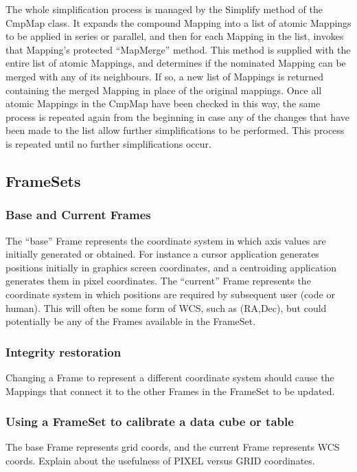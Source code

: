 \documentclass[final,authoryear,5p,times,twocolumn]{elsarticle}
\begin{document}
The whole simplification process is managed by the Simplify method of
the CmpMap class. It expands the compound Mapping into a list of
atomic Mappings to be applied in series or parallel, and then for each
Mapping in the list, invokes that Mapping’s protected “MapMerge”
method. This method is supplied with the entire list of atomic
Mappings, and determines if the nominated Mapping can be merged with
any of its neighbours. If so, a new list of Mappings is returned
containing the merged Mapping in place of the original mappings. Once
all atomic Mappings in the CmpMap have been checked in this way, the
same process is repeated again from the beginning in case any of the
changes that have been made to the list allow further simplifications
to be performed. This process is repeated until no further
simplifications occur.

\subsection{FrameSets}

\subsubsection{Base and Current Frames}

The “base” Frame represents the coordinate system in which axis values
are initially generated or obtained. For instance a cursor application
generates positions initially in graphics screen coordinates, and a
centroiding application generates them in pixel coordinates.  The
“current” Frame represents the coordinate system in which positions
are required by subsequent user (code or human). This will often be
some form of WCS, such as (RA,Dec), but could potentially be any of
the Frames available in the FrameSet.

\subsubsection{Integrity restoration}

Changing a Frame to represent a different coordinate system should
cause the Mappings that connect it to the other Frames in the FrameSet
to be updated.

\subsubsection{Using a FrameSet to calibrate a data cube or table}

The base Frame represents grid coords, and the current Frame
represents WCS coords.  Explain about the usefulness of PIXEL versus
GRID coordinates.
\end{document}
